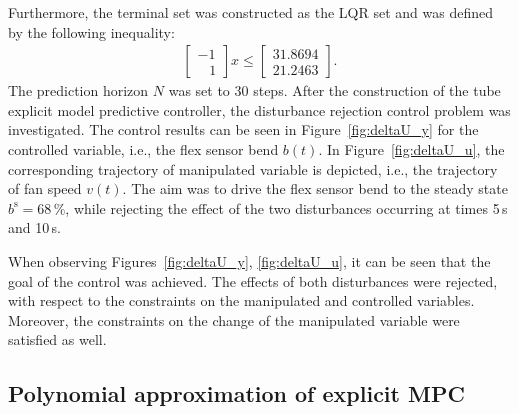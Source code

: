 \documentclass[letterpaper, 10 pt, conference]{ieeeconf}
\begin{document}
	Furthermore, the terminal set was constructed as the LQR set and was defined by the following inequality:
	\begin{eqnarray}
		\label{eq:setup_terminal_set}
		\begin{bmatrix}
			-1 \\	
			\,\,\,\,\, 1
		\end{bmatrix} x \le 
		\begin{bmatrix}
			31.8694\\	
			21.2463
		\end{bmatrix}.
	\end{eqnarray}
	The prediction horizon $N$ was set to 30 steps. 
	After the construction of the tube explicit model predictive controller, the disturbance rejection control problem was investigated. The control results can be seen in Figure~\ref{fig:deltaU_y} for the controlled variable, i.e., the flex sensor bend $b(t)$. In Figure~\ref{fig:deltaU_u}, the corresponding trajectory of manipulated variable is depicted, i.e., the trajectory of fan speed $v(t)$. The aim was to drive the flex sensor bend to the steady state $ b^\mathrm{s} = 68\,\%$, while rejecting the effect of the two disturbances occurring at times 5\,s and 10\,s. 
	
	When observing Figures~\ref{fig:deltaU_y}, \ref{fig:deltaU_u}, it can be seen that the goal of the control was achieved. The effects of both disturbances were rejected, with respect to the constraints on the manipulated and controlled variables. Moreover, the constraints on the change of the manipulated variable were satisfied as well.
	
	\subsection{Polynomial approximation of explicit MPC}
	\label{sec:polynomial_exp}
	
\end{document}
